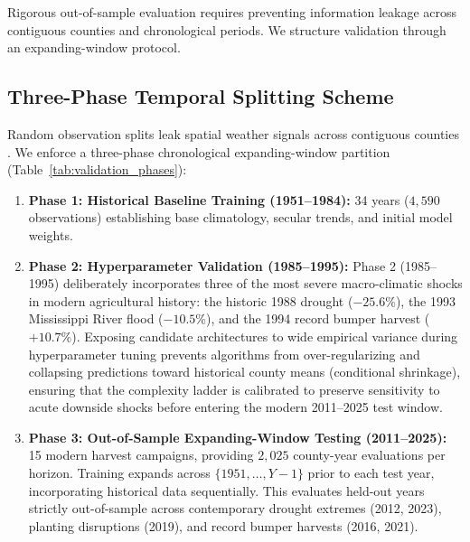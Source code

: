 Rigorous out-of-sample evaluation requires preventing information leakage across contiguous counties and chronological periods. We structure validation through an expanding-window protocol.

\subsection{Three-Phase Temporal Splitting Scheme}
\label{sec:meth_expanding_split}

Random observation splits leak spatial weather signals across contiguous counties \citep{Sweetetal2023}. We enforce a three-phase chronological expanding-window partition (Table~\ref{tab:validation_phases}):
\begin{enumerate}
    \item \textbf{Phase 1: Historical Baseline Training (1951--1984):} 34 years ($4{,}590$ observations) establishing base climatology, secular trends, and initial model weights.
    \item \textbf{Phase 2: Hyperparameter Validation (1985--1995):} Phase 2 (1985--1995) deliberately incorporates three of the most severe macro-climatic shocks in modern agricultural history: the historic 1988 drought ($-25.6\%$), the 1993 Mississippi River flood ($-10.5\%$), and the 1994 record bumper harvest ($+10.7\%$). Exposing candidate architectures to wide empirical variance during hyperparameter tuning prevents algorithms from over-regularizing and collapsing predictions toward historical county means (conditional shrinkage), ensuring that the complexity ladder is calibrated to preserve sensitivity to acute downside shocks before entering the modern 2011--2025 test window.
    \item \textbf{Phase 3: Out-of-Sample Expanding-Window Testing (2011--2025):} 15 modern harvest campaigns, providing $2{,}025$ county-year evaluations per horizon. Training expands across $\{1951, \dots, Y-1\}$ prior to each test year, incorporating historical data sequentially. This evaluates held-out years strictly out-of-sample across contemporary drought extremes (2012, 2023), planting disruptions (2019), and record bumper harvests (2016, 2021).
\end{enumerate}


